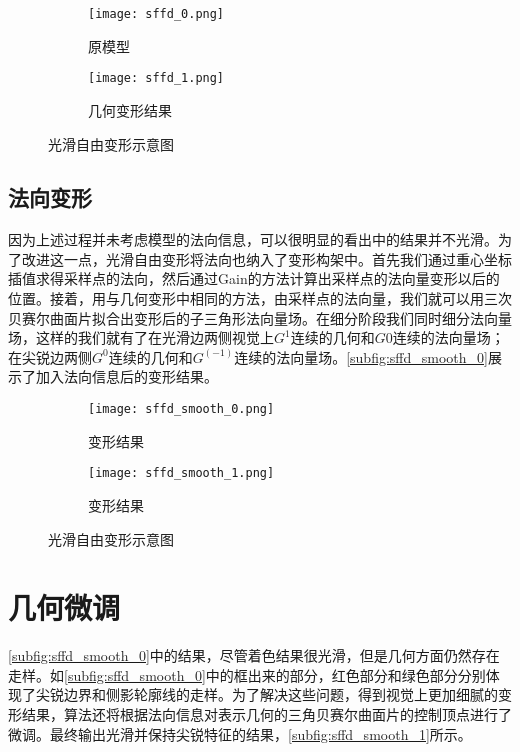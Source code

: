 \begin{figure}[htbp]
	\centering
	\begin{subfigure}[b]{.4\textwidth}
		\centering
		\texttt{[image: sffd\_0.png]}
		\caption{原模型}\label{subfig:sffd_0}
	\end{subfigure}
	\quad
	\begin{subfigure}[b]{.4\textwidth}
		\centering
		\texttt{[image: sffd\_1.png]}
		\caption{几何变形结果}\label{subfig:sffd_1}
	\end{subfigure}
    \caption{光滑自由变形示意图}\label{fig:sffd}
\end{figure}

\subsection{法向变形}
因为上述过程并未考虑模型的法向信息，可以很明显的看出\label{subfig:sffd_1}中的结果并不光滑。为了改进这一点，光滑自由变形将法向也纳入了变形构架中。首先我们通过重心坐标插值求得采样点的法向，然后通过Gain\cite{gain1999}的方法计算出采样点的法向量变形以后的位置。接着，用与几何变形中相同的方法，由采样点的法向量，我们就可以用三次贝赛尔曲面片拟合出变形后的子三角形法向量场。在细分阶段我们同时细分法向量场，这样的我们就有了在光滑边两侧视觉上$G^1$连续的几何和$G0$连续的法向量场；在尖锐边两侧$G^0$连续的几何和$G^(-1)$连续的法向量场。\autoref{subfig:sffd_smooth_0}展示了加入法向信息后的变形结果。

\begin{figure}[htbp]
	\centering
	\begin{subfigure}[b]{.4\textwidth}
		\centering
		\texttt{[image: sffd\_smooth\_0.png]}
		\caption{变形结果}\label{subfig:sffd_smooth_0}
	\end{subfigure}
	\quad
	\begin{subfigure}[b]{.4\textwidth}
		\centering
		\texttt{[image: sffd\_smooth\_1.png]}
		\caption{变形结果}\label{subfig:sffd_smooth_1}
	\end{subfigure}
    \caption{光滑自由变形示意图}\label{fig:sffd}
\end{figure}

\section{几何微调}
\autoref{subfig:sffd_smooth_0}中的结果，尽管着色结果很光滑，但是几何方面仍然存在走样。如\autoref{subfig:sffd_smooth_0}中的框出来的部分，红色部分和绿色部分分别体现了尖锐边界和侧影轮廓线的走样。为了解决这些问题，得到视觉上更加细腻的变形结果，算法还将根据法向信息对表示几何的三角贝赛尔曲面片的控制顶点进行了微调。最终输出光滑并保持尖锐特征的结果，\autoref{subfig:sffd_smooth_1}所示。

